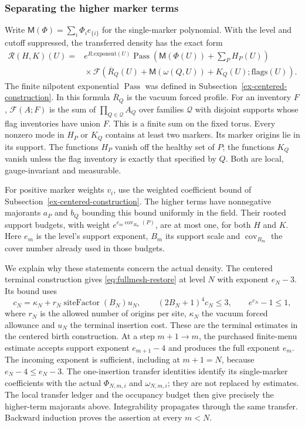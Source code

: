 \subsubsection{Separating the higher marker terms}
Write $\mathsf M(\Phi)=\sum_i\Phi_i e_{\{i\}}$ for the
single-marker polynomial. With the level and cutoff suppressed, the
transferred density has the exact form
\begin{equation}\label{eq:fullmesh-restore}
 \begin{split}
 \mathcal R(H,K)(U)={}&e^{R.\mathrm{exponent}(U)}
 \operatorname{Pass}\!\left(\mathsf M(\Phi(U))+\sum_P H_P(U)\right)
 \\ &{}\times \mathcal F\!\left(\overline R_Q(U)+\mathsf M(\omega(Q,U))+K_Q(U);
                         \mathrm{flags}(U)\right).
 \end{split}
\end{equation}
The finite nilpotent exponential $\operatorname{Pass}$ was defined in
Subsection~\ref{ex-centered-construction}. In this formula
$\overline R_Q$ is the vacuum forced profile. For an inventory $F$,
$\mathcal F(A;F)$ is the sum of $\prod_{Q\in\mathcal Q}A_Q$ over
families $\mathcal Q$ with disjoint supports whose flag inventories
have union $F$. This is a finite sum on the fixed torus.
Every nonzero mode in $H_P$ or $K_Q$ contains at least two markers.
Its marker origins lie in its support. The functions $H_P$ vanish
off the healthy set of $P$; the functions $K_Q$ vanish unless the
flag inventory is exactly that specified by $Q$. Both are local,
gauge-invariant and measurable.

For positive marker weights $v_i$, use the weighted coefficient bound
of Subsection~\ref{ex-centered-construction}. The higher terms have
nonnegative majorants $a_P$ and $b_Q$ bounding this bound uniformly
in the field. Their rooted support budgets, with weight
$e^{e_m\operatorname{cov}_{B_m}(P)}$, are at most one, for both
$H$ and $K$. Here $e_m$ is the level's support exponent,
$B_m$ its support scale and $\operatorname{cov}_{B_m}$ the cover
number already used in those budgets.

We explain why these statements concern the actual density. The
centered terminal construction gives \eqref{eq:fullmesh-restore} at
level $N$ with exponent $e_N-3$. Its bound uses
\[
 c_N=\kappa_N+r_N\operatorname{siteFactor}(B_N)u_N,
 \qquad (2B_N+1)^4c_N\le3,\qquad e^{c_N}-1\le1,
\]
where $r_N$ is the allowed number of origins per site, $\kappa_N$
the vacuum forced allowance and $u_N$ the terminal insertion cost.
These are the terminal estimates in the centered birth construction.
At a step $m+1\to m$, the purchased finite-menu estimate accepts
support exponent $e_{m+1}-4$ and produces the full exponent $e_m$.
The incoming exponent is sufficient, including at $m+1=N$, because
$e_N-4\le e_N-3$. The one-insertion transfer identities identify
its single-marker coefficients with the actual $\Phi_{N,m,i}$ and
$\omega_{N,m,i}$; they are not replaced by estimates. The local
transfer ledger and the occupancy budget then give precisely the
higher-term majorants above. Integrability propagates through the
same transfer. Backward induction proves the assertion at every
$m<N$.

